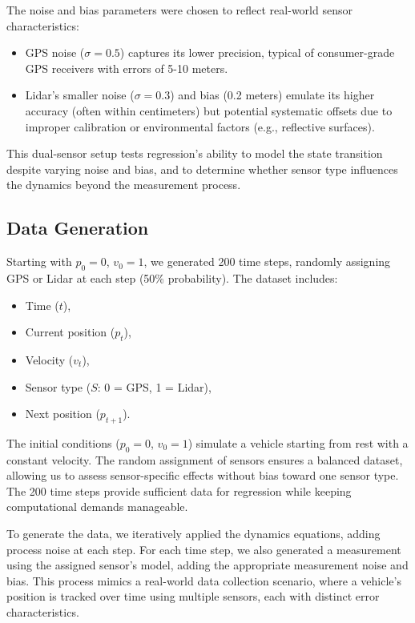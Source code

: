 \documentclass[12pt]{article}
\begin{document}
The noise and bias parameters were chosen to reflect real-world sensor characteristics:
\begin{itemize}
    \item GPS noise (\( \sigma = 0.5 \)) captures its lower precision, typical of consumer-grade GPS receivers with errors of 5-10 meters.
    \item Lidar’s smaller noise (\( \sigma = 0.3 \)) and bias (0.2 meters) emulate its higher accuracy (often within centimeters) but potential systematic offsets due to improper calibration or environmental factors (e.g., reflective surfaces).
\end{itemize}

This dual-sensor setup tests regression’s ability to model the state transition despite varying noise and bias, and to determine whether sensor type influences the dynamics beyond the measurement process.

\subsection{Data Generation}
\label{subsec:data_generation}

Starting with \( p_0 = 0 \), \( v_0 = 1 \), we generated 200 time steps, randomly assigning GPS or Lidar at each step (50\% probability). The dataset includes:
\begin{itemize}
    \item Time (\( t \)),
    \item Current position (\( p_t \)),
    \item Velocity (\( v_t \)),
    \item Sensor type (\( S \): 0 = GPS, 1 = Lidar),
    \item Next position (\( p_{t+1} \)).
\end{itemize}

The initial conditions (\( p_0 = 0 \), \( v_0 = 1 \)) simulate a vehicle starting from rest with a constant velocity. The random assignment of sensors ensures a balanced dataset, allowing us to assess sensor-specific effects without bias toward one sensor type. The 200 time steps provide sufficient data for regression while keeping computational demands manageable.

To generate the data, we iteratively applied the dynamics equations, adding process noise at each step. For each time step, we also generated a measurement using the assigned sensor’s model, adding the appropriate measurement noise and bias. This process mimics a real-world data collection scenario, where a vehicle’s position is tracked over time using multiple sensors, each with distinct error characteristics.
\end{document}
